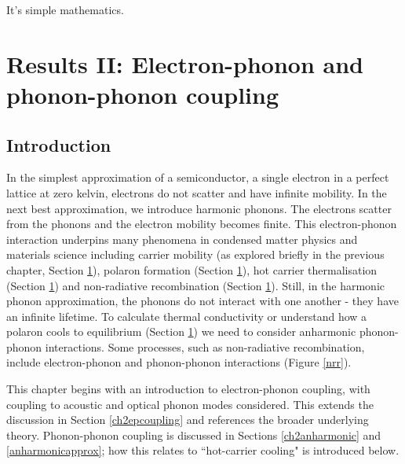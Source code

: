 \begin{savequote}[8cm]
It's simple mathematics.
\end{savequote}

\chapter{\label{ch:5-epcoupling}Results II: Electron-phonon and phonon-phonon coupling}
\section{Introduction} \label{ch5:introduction}

In the simplest approximation of a semiconductor, a single electron in a perfect lattice at zero kelvin, electrons do not scatter and have infinite mobility. In the next best approximation, we introduce harmonic phonons. The electrons scatter from the phonons and the electron mobility becomes finite. This electron-phonon interaction underpins many phenomena in condensed matter physics and materials science including carrier mobility (as explored briefly in the previous chapter, Section \ref{}), polaron formation (Section \ref{}), hot carrier thermalisation (Section \ref{}) and non-radiative recombination (Section \ref{}). Still, in the harmonic phonon approximation, the phonons do not interact with one another - they have an infinite lifetime. To calculate thermal conductivity or understand how a polaron cools to equilibrium (Section \ref{}) we need to consider anharmonic phonon-phonon interactions. Some processes, such as non-radiative recombination, include electron-phonon and phonon-phonon interactions (Figure \ref{nrr}).

This chapter begins with an introduction to electron-phonon coupling, with coupling to acoustic and optical phonon modes considered. This extends the discussion in Section \ref{ch2epcoupling} and references the broader underlying theory. Phonon-phonon coupling is discussed in Sections \ref{ch2anharmonic} and \ref{anharmonicapprox}; how this relates to ``hot-carrier cooling" is introduced below.

